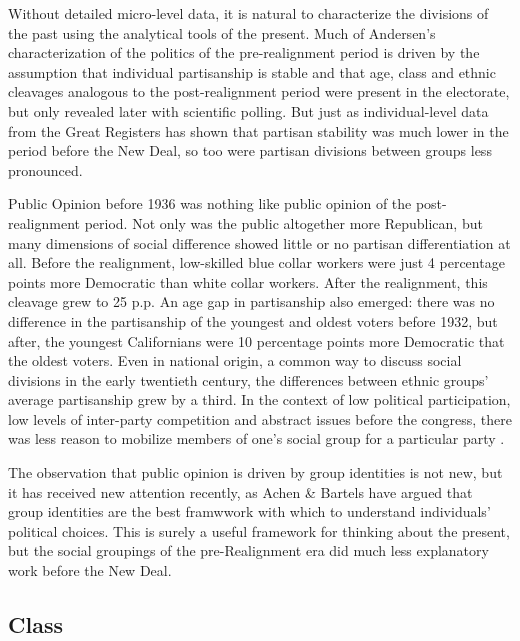 \documentclass[11pt]{scrartcl}\usepackage[]{graphicx}\usepackage[]{color}
\begin{document}
Without detailed micro-level data, it is natural to characterize the divisions of the past using the analytical tools of the present. Much of Andersen's \citeyearpar{andersen1979creation} characterization of the politics of the pre-realignment period is driven by the assumption that individual partisanship is stable and that age, class and ethnic cleavages analogous to the post-realignment period were present in the electorate, but only revealed later with scientific polling. But just as individual-level data from the Great Registers has shown that partisan stability was much lower in the period before the New Deal, so too were partisan divisions between groups less pronounced.

Public Opinion before 1936 was nothing like public opinion of the post-realignment period. Not only was the public altogether more Republican, but many dimensions of social difference showed little or no partisan differentiation at all. Before the realignment, low-skilled blue collar workers were just 4 percentage points more Democratic than white collar workers. After the realignment, this cleavage grew to 25 p.p. An age gap in partisanship also emerged: there was no difference in the partisanship of the youngest and oldest voters before 1932, but after, the youngest Californians were 10 percentage points more Democratic that the oldest voters. Even in national origin, a common way to discuss social divisions in the early twentieth century, the differences between ethnic groups' average partisanship grew by a third. In the context of low political participation, low levels of inter-party competition and abstract issues before the congress, there was less reason to mobilize members of one's social group for a particular party \citep{burnham1965changing}.

The observation that public opinion is driven by group identities is not new, but it has received new attention recently, as Achen \& Bartels \citeyearpar{achen2016democracy} have argued that group identities are the best framwwork with which to understand individuals' political choices.  This is surely a useful framework for thinking about the present, but the social groupings of the pre-Realignment era did much less explanatory work before the New Deal.

\subsection*{Class}

\end{document}
